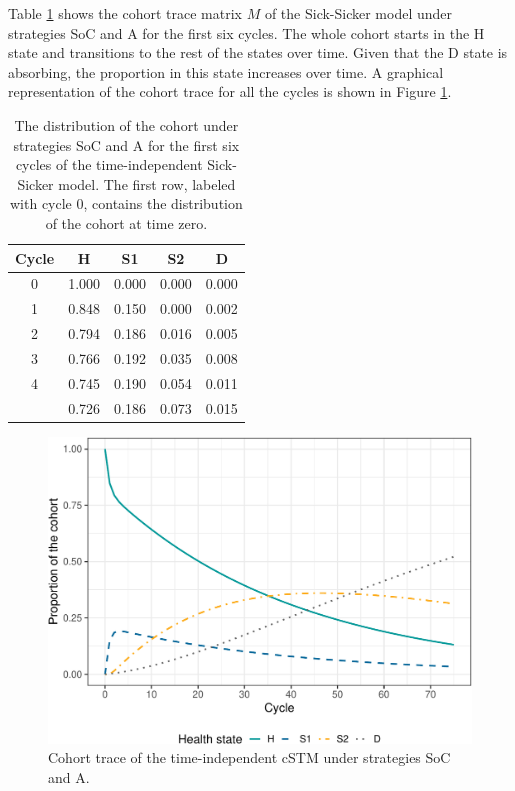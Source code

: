 \documentclass[
]{article}
\begin{document}
Table \ref{tab:Trace} shows the cohort trace matrix \(M\) of the Sick-Sicker model under strategies SoC and A for the first six cycles. The whole cohort starts in the H state and transitions to the rest of the states over time. Given that the D state is absorbing, the proportion in this state increases over time. A graphical representation of the cohort trace for all the cycles is shown in Figure \ref{fig:Sick-Sicker-Trace-TimeHom}.

\begin{table}[!h]

\caption{\label{tab:Trace}The distribution of the cohort under strategies SoC and A for the first six cycles of the time-independent Sick-Sicker model. The first row, labeled with cycle 0, contains the distribution of the cohort at time zero.}
\centering
\begin{tabular}[t]{ccccc}
\toprule
Cycle & H & S1 & S2 & D\\
\midrule
0 & 1.000 & 0.000 & 0.000 & 0.000\\
1 & 0.848 & 0.150 & 0.000 & 0.002\\
2 & 0.794 & 0.186 & 0.016 & 0.005\\
3 & 0.766 & 0.192 & 0.035 & 0.008\\
4 & 0.745 & 0.190 & 0.054 & 0.011\\
\addlinespace
5 & 0.726 & 0.186 & 0.073 & 0.015\\
\bottomrule
\end{tabular}
\end{table}

\begin{figure}[H]

{\centering \includegraphics{figs/Sick-Sicker-Trace-TimeHom-1} 

}

\caption{Cohort trace of the time-independent cSTM under strategies SoC and A.}\label{fig:Sick-Sicker-Trace-TimeHom}
\end{figure}
\end{document}
